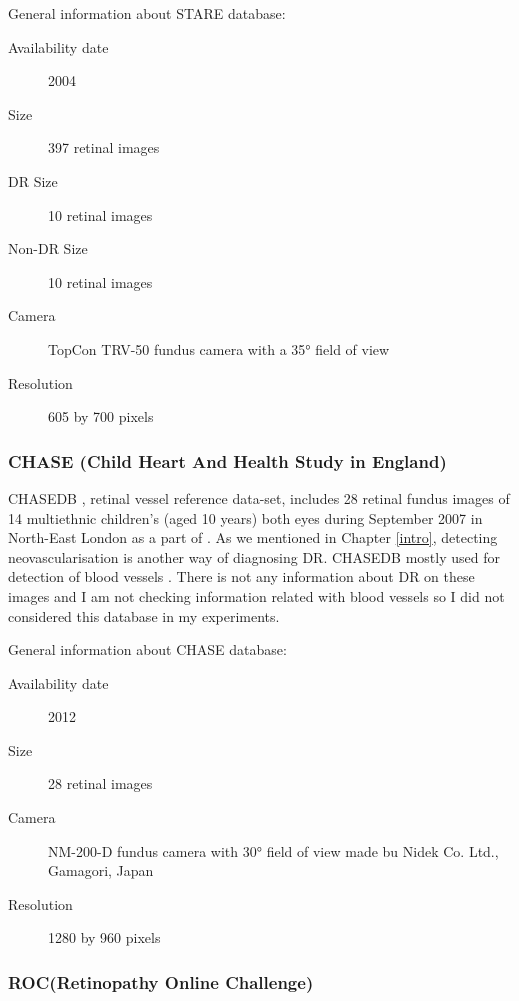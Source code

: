 General information about STARE database:

\begin{description}
    \item[Availability date] 2004
    \item[Size] 397 retinal images
    \item[DR Size] 10 retinal images
    \item[Non-DR Size] 10 retinal images
    \item[Camera] TopCon TRV-50 fundus camera with a 35° field of view
    \item[Resolution] 605 by 700 pixels
\end{description}

\subsubsection{CHASE (Child Heart And Health Study in England)}

CHASEDB \citep{Retinal-image-database}, retinal vessel reference data-set, includes 28 retinal fundus images of 14 multiethnic children's (aged 10 years) both eyes during September 2007 in North-East London as a part of \citep{fraz2012ensemble}. As we mentioned in Chapter \ref{intro}, detecting neovascularisation is another way of diagnosing DR. CHASEDB mostly used for detection of blood vessels \citep{liskowski2016segmenting, elbalaoui2016automatic}. There is not any information about DR on these images and I am not checking information related with blood vessels so I did not considered this database in my experiments.

General information about CHASE database:
\begin{description}
    \item[Availability date] 2012
    \item[Size] 28 retinal images
    \item[Camera] NM-200-D fundus camera with 30° field of view made bu Nidek Co. Ltd., Gamagori, Japan
    \item[Resolution] 1280 by 960 pixels
\end{description}

\subsubsection{ROC(Retinopathy Online Challenge)}


